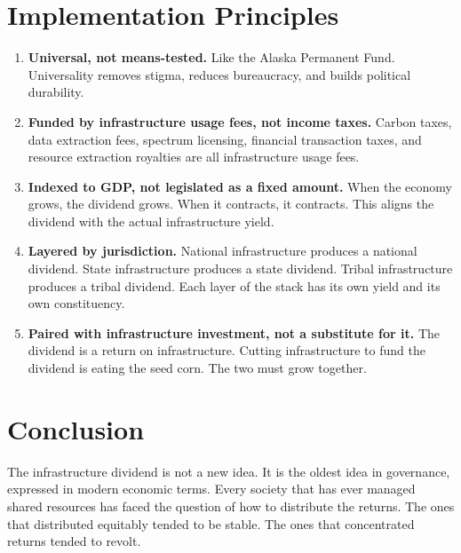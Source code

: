 \documentclass[11pt,letterpaper]{article}
\begin{document}
\section{Implementation Principles}

\begin{enumerate}[leftmargin=1.5em]
\item \textbf{Universal, not means-tested.} Like the Alaska Permanent Fund. Universality removes stigma, reduces bureaucracy, and builds political durability.

\item \textbf{Funded by infrastructure usage fees, not income taxes.} Carbon taxes, data extraction fees, spectrum licensing, financial transaction taxes, and resource extraction royalties are all infrastructure usage fees.

\item \textbf{Indexed to GDP, not legislated as a fixed amount.} When the economy grows, the dividend grows. When it contracts, it contracts. This aligns the dividend with the actual infrastructure yield.

\item \textbf{Layered by jurisdiction.} National infrastructure produces a national dividend. State infrastructure produces a state dividend. Tribal infrastructure produces a tribal dividend. Each layer of the stack has its own yield and its own constituency.

\item \textbf{Paired with infrastructure investment, not a substitute for it.} The dividend is a return on infrastructure. Cutting infrastructure to fund the dividend is eating the seed corn. The two must grow together.
\end{enumerate}

\section*{Conclusion}

The infrastructure dividend is not a new idea. It is the oldest idea in governance, expressed in modern economic terms. Every society that has ever managed shared resources has faced the question of how to distribute the returns. The ones that distributed equitably tended to be stable. The ones that concentrated returns tended to revolt.
\end{document}
